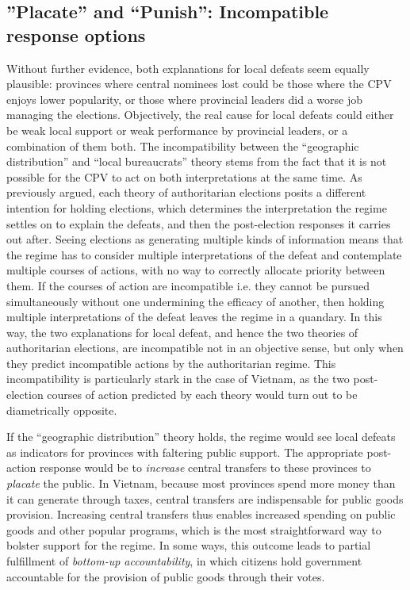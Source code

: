\documentclass[12pt]{article}\usepackage[]{graphicx}\usepackage[]{color}
\newcommand{\1}{\mathbbm{1}}
\begin{document}
\subsection{''Placate'' and ``Punish'': Incompatible response options}
\label{sec:vs}
Without further evidence, both explanations for local defeats seem equally plausible: provinces where central nominees lost could be those where the CPV enjoys lower popularity, or those where provincial leaders did a worse job managing the elections. Objectively, the real cause for local defeats could either be weak local support or weak performance by provincial leaders, or a combination of them both. The incompatibility between the ``geographic distribution'' and ``local bureaucrats'' theory stems from the fact that it is not possible for the CPV to act on both interpretations at the same time. As previously argued, each theory of authoritarian elections posits a different intention for holding elections, which determines the interpretation the regime settles on to explain the defeats, and then the post-election responses it carries out after. Seeing elections as generating multiple kinds of information means that the regime has to consider multiple interpretations of the defeat and contemplate multiple courses of actions, with no way to correctly allocate priority between them. If the courses of action are incompatible i.e. they cannot be pursued simultaneously without one undermining the efficacy of another, then holding multiple interpretations of the defeat leaves the regime in a quandary. In this way, the two explanations for local defeat, and hence the two theories of authoritarian elections, are incompatible not in an objective sense, but only when they predict incompatible actions by the authoritarian regime. This incompatibility is particularly stark in the case of Vietnam, as the two post-election courses of action predicted by each theory would turn out to be diametrically opposite.

If the ``geographic distribution'' theory holds, the regime would see local defeats as indicators for provinces with faltering public support. The appropriate post-action response would be to  \textit{increase} central transfers to these provinces to \textit{placate} the public. In Vietnam, because most provinces spend more money than it can generate through taxes, central transfers are indispensable for public goods provision. Increasing central transfers thus enables increased spending on public goods and other popular programs, which is the most straightforward way to bolster support for the regime. In some ways, this outcome leads to partial fulfillment of \textit{bottom-up accountability}, in which citizens hold government accountable for the provision of public goods through their votes.
\end{document}
